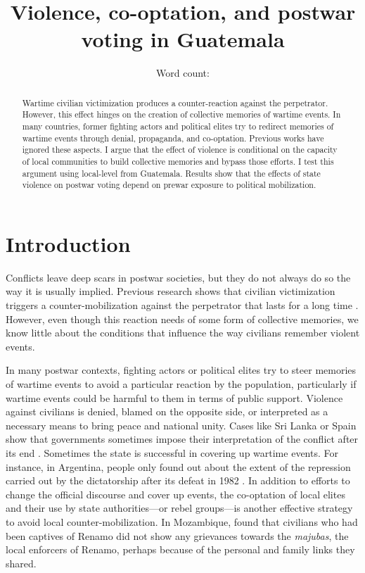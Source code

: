 \documentclass[12pt, notitlepage]{article}
\title{\Large Violence, co-optation, and postwar voting in Guatemala}
\author{}%
\date{Word count: {\color{red}{\textbf{9,990}}}}
\begin{document}
\maketitle
\thispagestyle{empty}

\vspace{30pt}

\begin{abstract}

Wartime civilian victimization produces a counter-reaction against the perpetrator. However, this effect hinges on the creation of collective memories of wartime events. In many countries, former fighting actors and political elites try to redirect memories of wartime events through denial, propaganda, and co-optation. Previous works have ignored these aspects. I argue that the effect of violence is conditional on the capacity of local communities to build collective memories and bypass those efforts. I test this argument using local-level from Guatemala. Results show that the effects of state violence on postwar voting depend on prewar exposure to political mobilization.

\end{abstract}

\newpage
\setcounter{page}{1}

\section*{Introduction}

Conflicts leave deep scars in postwar societies, but they do not always do so the way it is usually implied.
Previous research shows that civilian victimization triggers a counter-mobilization against the perpetrator that lasts for a long time \citep{Balcells:2012aa, Lupu:2017aa, Fontana:2017aa, Rozenas:2017aa, Rozenas:2019aa}.
However, even though this reaction needs of some form of collective memories, we know little about the conditions that influence the way civilians remember violent events.

In many postwar contexts, fighting actors or political elites try to steer memories of wartime events to avoid a particular reaction by the population, particularly if wartime events could be harmful to them in terms of public support.
Violence against civilians is denied, blamed on the opposite side, or interpreted as a necessary means to bring peace and national unity.
Cases like Sri Lanka or Spain show that governments sometimes impose their interpretation of the conflict after its end \citep{Seoighe:2017aa, Palomares:2004aa}.
Sometimes the state is successful in covering up wartime events.
For instance, in Argentina, people only found out about the extent of the repression carried out by the dictatorship after its defeat in 1982 \citep{Robben:1995aa}.
In addition to efforts to change the official discourse and cover up events, the co-optation of local elites and their use by state authorities---or rebel groups---is another effective strategy to avoid local counter-mobilization.
In Mozambique, \citet{Finnegan:1992aa} found that civilians who had been captives of Renamo did not show any grievances towards the \textit{majubas}, the local enforcers of Renamo, perhaps because of the personal and family links they shared.
\end{document}
